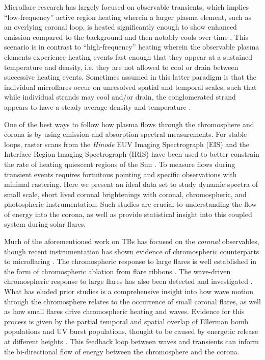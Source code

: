 \documentclass[twocolumn]{aastex62}
\begin{document}
Microflare research has largely focused on observable transients, which implies ``low-frequency'' active region heating wherein a larger plasma element, such as an overlying coronal loop, is heated significantly enough to show enhanced emission compared to the background and then notably cools over time \citep[][]{2015Klimchuk_CHoverview}. 
This scenario is in contrast to ``high-frequency'' heating wherein the observable plasma elements experience heating events fast enough that they appear at a sustained temperature and density, i.e. they are not allowed to cool or drain between successive heating events. 
Sometimes assumed in this latter paradigm is that the individual microflares occur on unresolved spatial and temporal scales, such that while individual strands may cool and/or drain, the conglomerated strand appears to have a steady average density and temperature \citep[e.g.][]{2013BrooksEA_LoopSize, 2014SubramanianEA_LowAndHighFrequency, 2016SchmelzEA}. 

One of the best ways to follow how plasma flows through the chromosphere and corona is by using emission and absorption spectral measurements. 
For stable loops, raster scans from the \textit{Hinode} EUV Imaging Spectrograph (EIS) and the Interface Region Imaging Spectrograph (IRIS) have been used to better constrain the rate of heating quiescent regions of the Sun \citep[e.g.][]{2016BrooksWarren_NTWidths,2016TestaEA_ARLoopsIRISEIS, 2017GhoshEA_LoopsIRISEIS}. 
To measure flows during transient events requires fortuitous pointing and specific observations with minimal rastering. 
Here we present an ideal data set to study dynamic spectra of small scale, short lived coronal brightenings with coronal, chromospheric, and photospheric instrumentation. 
Such studies are crucial to understanding the flow of energy into the corona, as well as provide statistical insight into this coupled system during solar flares.

Much of the aforementioned work on TBs has focused on the \emph{coronal} observables, though recent instrumentation has shown evidence of chromospheric counterparts to microflaring \citep[][]{2016TestaEA_ARLoopsIRISEIS, 2017GhoshEA_LoopsIRISEIS}. 
The chromospheric response to large flares is well established in the form of chromospheric ablation from flare ribbons \citep[][]{2017Benz_LRSP}. 
The wave-driven chromospheric response to large flares has also been detected and investigated \citep[][and references within]{2014LiuOfman_EUVwaves, 2016RussellEA_Sunquakes}. 
What has eluded prior studies is a comprehensive insight into how wave motion through the chromosphere relates to the occurrence of small coronal flares, as well as how small flares drive chromospheric heating and waves. 
Evidence for this process is given by the partial temporal and spatial overlap of Ellerman bomb populations and UV burst populations, thought to be caused by energetic release at different heights \citep{2019Vissers, 2018Young}.
This feedback loop between waves and transients can inform the bi-directional flow of energy between the chromosphere and the corona.
\end{document}
